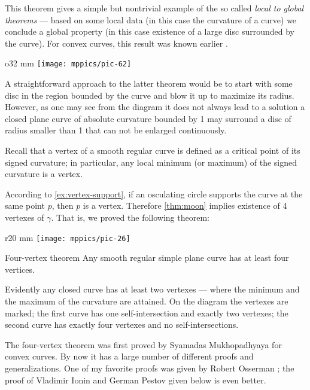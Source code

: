 This theorem gives a simple but nontrivial example of the so called \emph{local to global theorems} --- based on some local data (in this case the curvature of a curve) we conclude a global property (in this case existence of a large disc surrounded by the curve).
For convex curves, this result was known earlier \cite[\S 24]{blaschke}.

\begin{wrapfigure}{o}{32 mm}
\vskip-0mm
\centering
\texttt{[image: mppics/pic-62]}
\vskip0mm
\end{wrapfigure}

A straightforward approach to the latter theorem would be to start with some disc in the region bounded by the curve and blow it up to maximize its radius.
However, as one may see from the diagram it does not always lead to a solution a closed plane curve of absolute curvature bounded by 1 may surround a disc of radius smaller than 1 that can not be enlarged continuously.  

Recall that a vertex of a smooth regular curve is defined as a critical point of its signed curvature;
in particular, any local minimum (or maximum) of the signed curvature is a vertex.

According to \ref{ex:vertex-support}, if an osculating circle supports the curve at the same point $p$, then $p$ is a vertex.
Therefore \ref{thm:moon} implies existence of 4 vertexes of $\gamma$.
That is, we proved the following theorem:

{

\begin{wrapfigure}{r}{20 mm}
\vskip-5mm
\centering
\texttt{[image: mppics/pic-26]}
\vskip0mm
\end{wrapfigure}

\begin{thm}{Four-vertex theorem}\label{thm:4-vert}
Any smooth regular simple plane curve has at least four
vertices.
\end{thm}

Evidently any closed curve has at least two vertexes --- where the minimum and the maximum of the curvature are attained.
On the diagram the vertexes are marked;
the first curve has one self-intersection and exactly two vertexes;
the second curve has exactly four vertexes and no self-intersections.

}

The four-vertex theorem was first proved by Syamadas Mukhopadhyaya \cite{mukhopadhyaya} for convex curves.
By now it has a large number of different proofs and generalizations.
One of my favorite proofs was given by Robert Osserman \cite{osserman};
the proof of Vladimir Ionin and German Pestov given below is even better.

